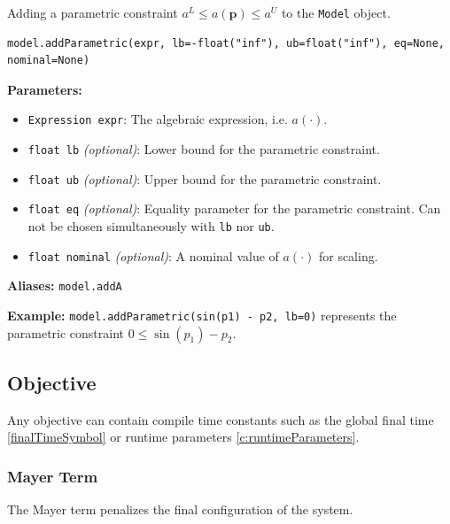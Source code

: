 \documentclass[12pt]{article}
\renewcommand{\v}{\bm}
\begin{document}
\begin{mdframed}[backgroundcolor=gray!10, roundcorner=10pt,
		linewidth=1pt]

	Adding a parametric constraint ${a}^{L} \leq {a}(\v{p}) \leq
		{a}^{U}$ to the \texttt{Model} object.

	\begin{lstlisting}
model.addParametric(expr, lb=-float("inf"), ub=float("inf"), eq=None, nominal=None)
		\end{lstlisting}
	\label{addParametric}
	\textbf{Parameters:}
	\begin{itemize}
		\item \texttt{Expression expr}: The algebraic
		      expression, i.e. $a(\cdot)$.
		\item \texttt{float lb} \emph{(optional)}: Lower bound
		      for the parametric constraint.
		\item \texttt{float ub} \emph{(optional)}: Upper bound
		      for the parametric constraint.
		\item \texttt{float eq} \emph{(optional)}: Equality
		      parameter for the parametric constraint. Can not be
		      chosen simultaneously with
		      \texttt{lb} nor \texttt{ub}.
		\item \texttt{float nominal} \emph{(optional)}: A
		      nominal value of $a(\cdot)$ for scaling.
	\end{itemize}

	\textbf{Aliases:}  \texttt{model.addA}

	\textbf{Example:} \texttt{model.addParametric(sin(p1) -
		p2, lb=0)} represents the parametric constraint
	$0 \leq \sin(p_1) - p_2$.
\end{mdframed}

\subsection{Objective}

Any objective can contain compile time constants such as the global
final time \eqref{finalTimeSymbol} or runtime parameters
\eqref{c:runtimeParameters}.

\subsubsection{Mayer Term}

The Mayer term penalizes the final configuration of the system.
\end{document}
